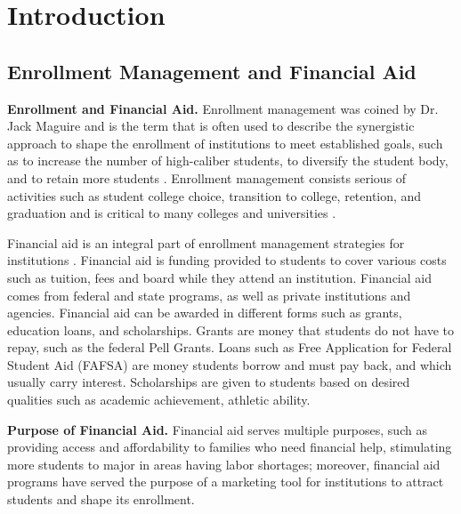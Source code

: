 \documentclass[12pt,english]{report}
\begin{document}
\chapter{Introduction}

\section{Enrollment Management and Financial Aid}

\noindent \textbf{Enrollment and Financial Aid.} Enrollment management was coined by Dr. Jack Maguire 
\citep{Maguire1976} and is the term that is often used to describe the synergistic approach to shape the 
enrollment of institutions to meet established goals, such as to increase the number of high-caliber 
students, to diversify the student body, and to retain more students \citep{Kemerer1982}. Enrollment 
management consists serious of activities such as student college choice, transition to college, 
retention, and graduation \citep{Hossler1990} and is critical to many colleges and universities 
\citep{Braunstein1999, Maltz2007, Aksenova2006}. 

Financial aid is an integral part of enrollment management strategies for 
institutions \citep{Dynarski2013}.  Financial aid is funding provided to 
students to cover various costs such as tuition, fees and board  while they 
attend an institution. Financial aid comes from federal and state 
programs, as well as private institutions and agencies. Financial aid can be 
awarded in different forms such as grants, education loans, and scholarships. 
Grants are money that students do not have to repay, 
such as the  federal Pell Grants. Loans such as Free Application for  Federal 
Student Aid (FAFSA) are money 
students borrow and  must pay back, and which usually carry interest. 
Scholarships are  given  to students based on desired qualities such as 
academic achievement, athletic ability. 

\vspace{0.15in}
\noindent \textbf{Purpose of Financial Aid.} Financial aid serves multiple 
purposes, such as providing access and affordability to families who need 
financial help, stimulating more students to major in areas having labor 
shortages; moreover, financial aid programs have served the purpose of a 
marketing tool for institutions to attract students and shape its enrollment. 
\end{document}

